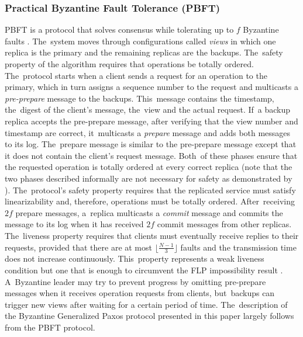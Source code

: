 \documentclass[algorithms,article,accept,moreauthors,pdftex,10pt,a4paper]{Definitions/mdpi}
\begin{document}
\subsubsection*{Practical Byzantine Fault Tolerance (PBFT)}
PBFT is a protocol that solves consensus while tolerating up to $f$ Byzantine faults \cite{CL99}. The~system moves through configurations called \textit{views} in which one replica is the primary and the remaining replicas are the backups. The~safety property of the algorithm requires that operations be totally ordered. The~protocol starts when a client sends a request for an operation to the primary, which in turn assigns a sequence number to the request and multicasts a \textit{pre-prepare} message to the backups. This~message contains the timestamp, the~digest of the client's message, the~view and the actual request. If~a backup replica accepts the pre-prepare message, after verifying that the view number and timestamp are correct, it~multicasts a \textit{prepare} message and adds both messages to its log. The~prepare message is similar to the pre-prepare message except that it does not contain the client's request message. Both~of these phases ensure that the requested operation is totally ordered at every correct replica (note that the two phases described informally are not necessary for safety as demonstrated by \cite{Dolev1983}). The~protocol's safety property requires that the replicated service must satisfy linearizability and, therefore, operations must be totally ordered. After~receiving $2f$ prepare messages, a~replica multicasts a \textit{commit} message and commits the message to its log when it has received $2f$ commit messages from other replicas. The~liveness property requires that clients must eventually receive replies to their requests, provided that there are at most $\lfloor\frac{N-1}{3}\rfloor$ faults and the transmission time does not increase continuously. This~property represents a weak liveness condition but one that is enough to circumvent the FLP impossibility result \cite{FLP85}. A~Byzantine leader may try to prevent progress by omitting pre-prepare messages when it receives operation requests from clients, but~backups can trigger new views after waiting for a certain period of time. The~description of the Byzantine Generalized Paxos protocol presented in this paper largely follows from the PBFT protocol.
\par


%
%
\end{document}
